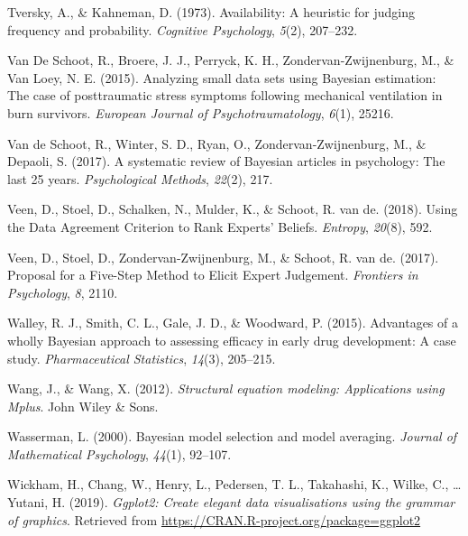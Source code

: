 \documentclass[openright,titlepage,12pt,a4paper]{book}
\begin{document}
\leavevmode\hypertarget{ref-tversky_availability:_1973}{}%
Tversky, A., \& Kahneman, D. (1973). Availability: A heuristic for judging frequency and probability. \emph{Cognitive Psychology}, \emph{5}(2), 207--232.

\leavevmode\hypertarget{ref-van_de_schoot_analyzing_2015}{}%
Van De Schoot, R., Broere, J. J., Perryck, K. H., Zondervan-Zwijnenburg, M., \& Van Loey, N. E. (2015). Analyzing small data sets using Bayesian estimation: The case of posttraumatic stress symptoms following mechanical ventilation in burn survivors. \emph{European Journal of Psychotraumatology}, \emph{6}(1), 25216.

\leavevmode\hypertarget{ref-van_de_schoot_systematic_2017}{}%
Van de Schoot, R., Winter, S. D., Ryan, O., Zondervan-Zwijnenburg, M., \& Depaoli, S. (2017). A systematic review of Bayesian articles in psychology: The last 25 years. \emph{Psychological Methods}, \emph{22}(2), 217.

\leavevmode\hypertarget{ref-veen_using_2018}{}%
Veen, D., Stoel, D., Schalken, N., Mulder, K., \& Schoot, R. van de. (2018). Using the Data Agreement Criterion to Rank Experts' Beliefs. \emph{Entropy}, \emph{20}(8), 592.

\leavevmode\hypertarget{ref-veen_proposal_2017}{}%
Veen, D., Stoel, D., Zondervan-Zwijnenburg, M., \& Schoot, R. van de. (2017). Proposal for a Five-Step Method to Elicit Expert Judgement. \emph{Frontiers in Psychology}, \emph{8}, 2110.

\leavevmode\hypertarget{ref-walley_advantages_2015}{}%
Walley, R. J., Smith, C. L., Gale, J. D., \& Woodward, P. (2015). Advantages of a wholly Bayesian approach to assessing efficacy in early drug development: A case study. \emph{Pharmaceutical Statistics}, \emph{14}(3), 205--215.

\leavevmode\hypertarget{ref-wang_structural_2012}{}%
Wang, J., \& Wang, X. (2012). \emph{Structural equation modeling: Applications using Mplus}. John Wiley \& Sons.

\leavevmode\hypertarget{ref-wasserman_bayesian_2000}{}%
Wasserman, L. (2000). Bayesian model selection and model averaging. \emph{Journal of Mathematical Psychology}, \emph{44}(1), 92--107.

\leavevmode\hypertarget{ref-R-ggplot2}{}%
Wickham, H., Chang, W., Henry, L., Pedersen, T. L., Takahashi, K., Wilke, C., \ldots{} Yutani, H. (2019). \emph{Ggplot2: Create elegant data visualisations using the grammar of graphics}. Retrieved from \url{https://CRAN.R-project.org/package=ggplot2}
\end{document}

